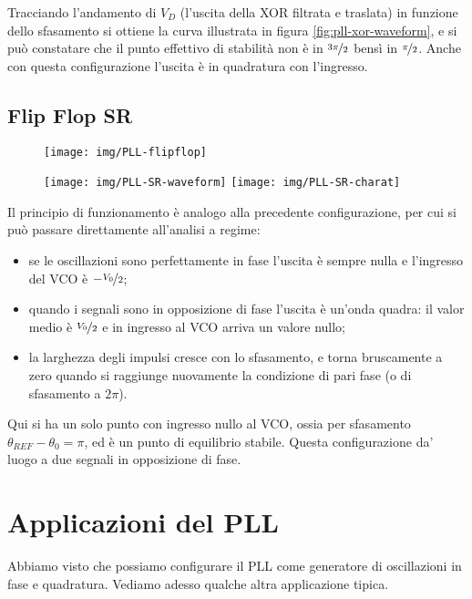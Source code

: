 Tracciando l'andamento di $V_D$ (l'uscita della XOR filtrata e traslata) in funzione dello sfasamento si ottiene la curva illustrata in figura \ref{fig:pll-xor-waveform}, e si può constatare che il punto effettivo di stabilità non è in $\nicefrac{3 \pi}{2}$ bensì in $\nicefrac{\pi}{2}$. Anche con questa configurazione l'uscita è in quadratura con l'ingresso.

\subsection{Flip Flop SR}
\begin{figure}[hbt]
	\centering
	\texttt{[image: img/PLL-flipflop]}
	\caption{}
	\label{fig:pll-SR}
\end{figure}

\begin{figure}[htb]
	\centering
	\texttt{[image: img/PLL-SR-waveform]}
	\texttt{[image: img/PLL-SR-charat]}
	\caption{}
	\label{fig:pll-SR-waveform}
\end{figure}

Il principio di funzionamento è analogo alla precedente configurazione, per cui si può passare direttamente all'analisi a regime:
\begin{itemize}
	\item se le oscillazioni sono perfettamente in fase l'uscita è sempre nulla e l'ingresso del VCO è $-\nicefrac{V_0}{2}$;
	\item quando i segnali sono in opposizione di fase l'uscita è un'onda quadra: il valor medio è $\nicefrac{V_0}{2}$ e in ingresso al VCO arriva un valore nullo;
	\item la larghezza degli impulsi cresce con lo sfasamento, e torna bruscamente a zero quando si raggiunge nuovamente la condizione di pari fase (o di sfasamento a $2\pi$).
\end{itemize}

Qui si ha un solo punto con ingresso nullo al VCO, ossia per sfasamento $\theta_{REF} - \theta_0 = \pi$, ed è un punto di equilibrio stabile.
Questa configurazione da' luogo a due segnali in opposizione di fase.

\section{Applicazioni del PLL}
Abbiamo visto che possiamo configurare il PLL come generatore di oscillazioni in fase e quadratura. Vediamo adesso qualche altra applicazione tipica.

